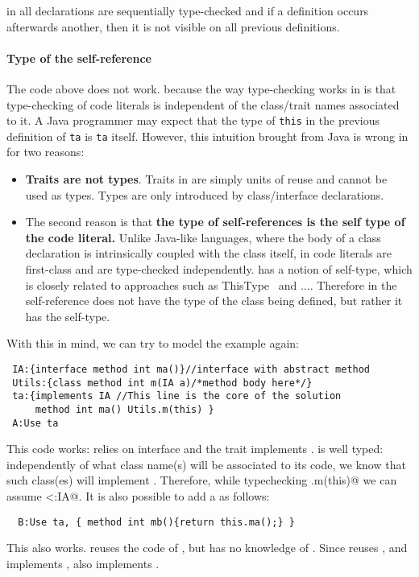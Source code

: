 in \name all declarations 
are sequentially type-checked and if a definition occurs afterwards
another, then it is not visible on all previous definitions.

\paragraph{Type of the self-reference} 
The code above does not work.
because the way type-checking works in \name is that type-checking of 
code literals is independent of the class/trait names associated to it.
A Java programmer may expect that the type of \lstinline{this} 
in the previous definition of \lstinline{ta} is \lstinline{ta}
itself. However, this intuition brought from Java is wrong in \name
for two reasons:

\begin{itemize}

\item {\bf Traits are not types}. Traits in
  \name are simply units of reuse and cannot be used as types. Types
  are only introduced by class/interface declarations.

\item The second reason is that {\bf the type of self-references is the self type of the
    code literal.} Unlike Java-like languages, where the body of a
  class declaration is intrinsically coupled with the class itself, in
  \name code literals are first-class and are type-checked independently.
  \name has a notion of self-type, which is closely related to
  approaches such as ThisType~\cite{} and ...\cite{others}. Therefore
  in \name the self-reference does not have the type of the class
  being defined, but rather it has the self-type.
\end{itemize}

With this in mind, we can try to model the example again:
\saveSpace
\begin{lstlisting}
 IA:{interface method int ma()}//interface with abstract method
 Utils:{class method int m(IA a)/*method body here*/}
 ta:{implements IA //This line is the core of the solution
     method int ma() Utils.m(this) }
 A:Use ta
\end{lstlisting}
\saveSpace
This code works: \Q@Utils@ relies on interface \Q@IA@ and the trait \Q@ta@
implements \Q@IA@.
\Q@ta@ is well typed: independently of what class name(s) will be
associated to its code, we know that such class(es) will implement
\Q@IA@. 
Therefore, while typechecking \Q@Utils.m(this)@ we can assume
\Q@this<:IA@.
 It is also possible to add a \Q@B@ as follows:
\saveSpace
\begin{lstlisting}
  B:Use ta, { method int mb(){return this.ma();} }
\end{lstlisting}
\saveSpace
This also works.  \Q@B@ reuses the code of \Q@ta@, but has no knowledge of \Q@A@.
Since \Q@B@ reuses \Q@ta@, and \Q@ta@ implements \Q@IA@, also \Q@B@ implements \Q@IA@. 

